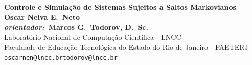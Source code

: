 \documentclass[a0,portrait]{a0poster}
\begin{document}


\begin{minipage}[b]{1.0\linewidth}
\center
\veryHuge \color{Black} \textbf{Controle e Simula\c{c}\~ao de Sistemas Sujeitos a Saltos Markovianos} \color{Black}\\ %
\Huge \textbf{Oscar Neiva E.~Neto}\\ %
{\huge\textbf{{\em orientador:}\, Marcos G.~Todorov, D.~Sc.}}\\ %
\huge Laborat\'orio Nacional de Computa\c{c}\~ao Cient\'ifica - LNCC\\
\huge Faculdade de Educa\c{c}\~ao Tecnol\'ogica do Estado do Rio de Janeiro - FAETERJ\\
\Large \texttt{oscarnen@lncc.br\qquad todorov@lncc.br}\\
\end{minipage}
%


\end{document}
